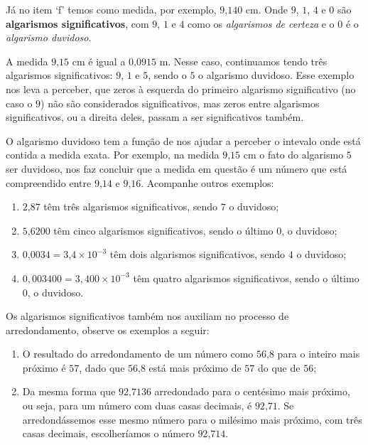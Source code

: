 Já no item ‘f’ temos como medida, por exemplo, $9\text{,}140$ cm. Onde  $9$, $1$, $4$ e $0$ são \textbf{algarismos significativos}, com $9$,  $1$ e $4$ como os \emph{algarismos de certeza} e o $0$ é o \emph{algarismo duvidoso}.

A medida $9\text{,}15$ cm é igual a $0\text{,}0915$ m. Nesse caso, continuamos tendo três algarismos significativos: $9$,  $1$ e $5$, sendo o $5$ o algarismo duvidoso. Esse exemplo nos leva a perceber, que zeros à esquerda do primeiro algarismo significativo (no caso o $9$) não são considerados significativos, mas zeros entre algarismos significativos, ou a direita deles, passam a ser significativos também.

O algarismo duvidoso tem a função de nos ajudar a perceber o intevalo onde está contida a medida exata. Por exemplo, na medida $9\text{,}15$ cm o fato do algarismo $5$ ser duvidoso, nos faz concluir que a medida em questão é um número que está compreendido entre $9\text{,}14$ e $9\text{,}16$. Acompanhe outros exemplos:

\begin{example}{}

\begin{enumerate}
\item {} 
$2\text{,}87$ têm três algarismos significativos, sendo $7$ o duvidoso;

\item {} 
$5\text{,}6200$ têm cinco algarismos significativos, sendo o último $0$, o duvidoso;

\item {} 
$0\text{,}0034 = 3\text{,}4 \times 10^{-3}$ têm dois algarismos significativos, sendo $4$ o duvidoso;

\item {} 
$0,003400 = 3,400 \times 10^{-3}$ têm quatro algarismos significativos, sendo o último $0$, o duvidoso.

\end{enumerate}
\end{example}


\label{\detokenize{NO103-5:para-saber-mais-arredondamento}}
Os algarismos significativos também nos auxiliam no processo de arredondamento, observe os exemplos a seguir:
\begin{enumerate}
\item {} 
O resultado do arredondamento de um número como $56\text{,}8$ para o inteiro mais próximo é $57$, dado que $56\text{,}8$ está mais próximo de $57$ do que de $56$;

\item {} 
Da mesma forma que $92\text{,}7136$ arredondado para o centésimo mais próximo, ou seja, para um número com duas casas decimais, é $92\text{,}71$. Se arredondássemos esse mesmo número para o milésimo mais próximo, com três casas decimais, escolheríamos o número $92\text{,}714$.

\end{enumerate}

